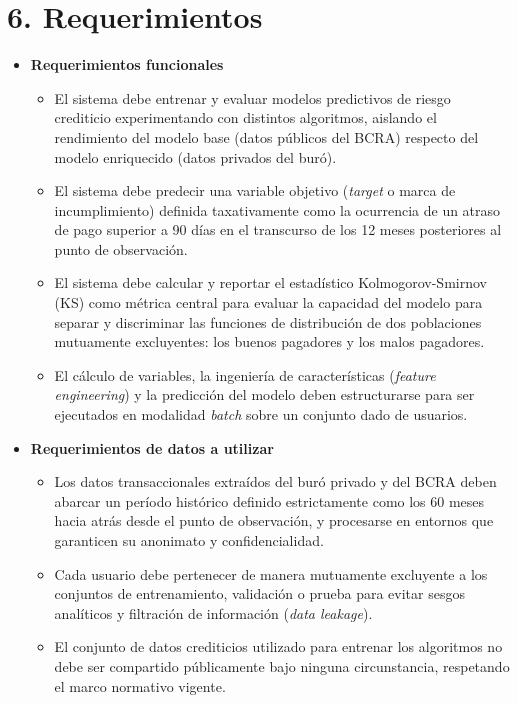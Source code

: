 \documentclass[
11pt, %
]{charter}
\begin{document}
\section{6. Requerimientos}
\label{sec:requerimientos}

\begin{itemize}

    \item \textbf{Requerimientos funcionales}
    \begin{itemize}
        \item El sistema debe entrenar y evaluar modelos predictivos de riesgo crediticio experimentando con distintos algoritmos, aislando el rendimiento del modelo base (datos públicos del BCRA) respecto del modelo enriquecido (datos privados del buró).
        \item El sistema debe predecir una variable objetivo (\textit{target} o marca de incumplimiento) definida taxativamente como la ocurrencia de un atraso de pago superior a 90 días en el transcurso de los 12 meses posteriores al punto de observación.
        \item El sistema debe calcular y reportar el estadístico Kolmogorov-Smirnov (KS) como métrica central para evaluar la capacidad del modelo para separar y discriminar las funciones de distribución de dos poblaciones mutuamente excluyentes: los buenos pagadores y los malos pagadores.
        \item El cálculo de variables, la ingeniería de características (\textit{feature engineering}) y la predicción del modelo deben estructurarse para ser ejecutados en modalidad \textit{batch} sobre un conjunto dado de usuarios.
    \end{itemize}

    \item \textbf{Requerimientos de datos a utilizar}
    \begin{itemize}
        \item Los datos transaccionales extraídos del buró privado y del BCRA deben abarcar un período histórico definido estrictamente como los 60 meses hacia atrás desde el punto de observación, y procesarse en entornos que garanticen su anonimato y confidencialidad.
        \item Cada usuario debe pertenecer de manera mutuamente excluyente a los conjuntos de entrenamiento, validación o prueba para evitar sesgos analíticos y filtración de información (\textit{data leakage}).
        \item El conjunto de datos crediticios utilizado para entrenar los algoritmos no debe ser compartido públicamente bajo ninguna circunstancia, respetando el marco normativo vigente.
    \end{itemize}


\end{itemize}
\end{document}
